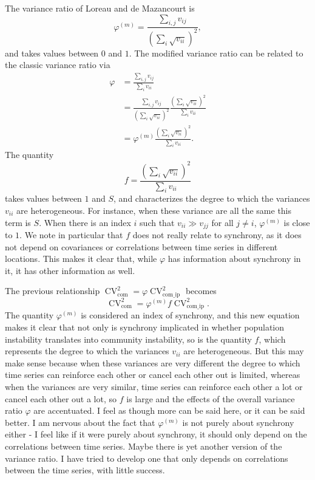 \documentclass[letterpaper,11pt]{article}
\newcommand{\CV}{{\operatorname{CV}}}
\newcommand{\com}{{\operatorname{com}}}
\newcommand{\comip}{{\operatorname{com\_ip}}}
\begin{document}
The variance ratio of Loreau and de Mazancourt is 
\begin{equation}
\varphi^{(m)}=\frac{\sum_{i,j} v_{ij}}{(\sum_i \sqrt{v_{ii}})^2},
\end{equation}
and takes values between $0$ and $1$. The modified variance ratio 
can be related to the classic variance ratio via
\begin{align}
\varphi &= \frac{\sum_{i,j} v_{ij}}{\sum_i v_{ii}} \\
&= \frac{\sum_{i,j} v_{ij}}{(\sum_i \sqrt{v_{ii}})^2}
\frac{(\sum_i \sqrt{v_{ii}})^2}{\sum_i v_{ii}} \\
&= \varphi^{(m)} \frac{(\sum_i \sqrt{v_{ii}})^2}{\sum_i v_{ii}}.
\end{align}
The quantity 
\begin{equation}
f=\frac{(\sum_i \sqrt{v_{ii}})^2}{\sum_i v_{ii}}
\end{equation}
takes values between $1$ and $S$, and characterizes the degree to which the 
variances $v_{ii}$ are heterogeneous. For instance, when these variance are all
the same this term is $S$. When there is an index $i$ such that 
$v_{ii} \gg v_{jj}$ for all $j \neq i$, $\varphi^{(m)}$ is close to $1$. 
We note in particular that $f$ does not really relate to synchrony,
as it does not depend on covariances or correlations between time series in
different locations. This makes it clear that, while $\varphi$ has information
about synchrony in it, it has other information as well.

The previous relationship $\CV_{\com}^2=\varphi \CV_{\comip}^2$ becomes 
\begin{equation}
\CV_{\com}^2=\varphi^{(m)} f \CV_{\comip}^2.
\end{equation}
The quantity $\varphi^{(m)}$ is considered an index of synchrony, and this 
new equation makes it clear that not only is synchrony implicated in
whether population instability translates into community instability,
so is the quantity $f$, which represents the degree to which the variances
$v_{ii}$ are heterogeneous. But this may make sense because when these variances
are very different the degree to which time series can  reinforce each other
or cancel each other out is limited, whereas when the variances are very similar,
time series can reinforce each other a lot or cancel each other out a lot,
so $f$ is large and the effects of the overall variance ratio
$\varphi$ are accentuated. I feel as though more can be said here, or it 
can be said better. I am nervous about the fact that $\varphi^{(m)}$
is not purely about synchrony either - I feel like if it were purely 
about synchrony, it should only depend on the correlations between
time series. Maybe there is yet another version of the variance ratio. 
I have tried to develop one that only depends on correlations between the time
series, with little success.
\end{document}
